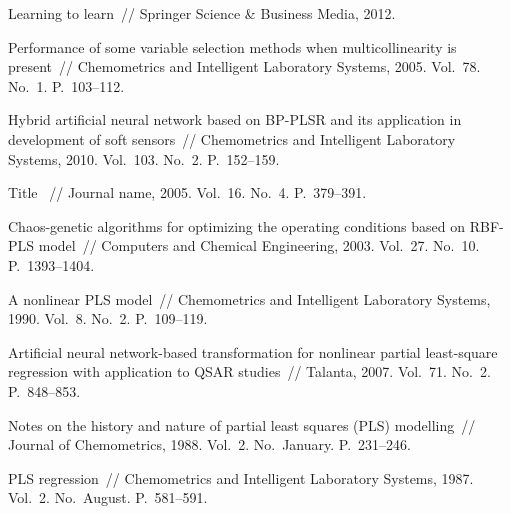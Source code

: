 \documentclass[12pt,twoside]{article}
\begin{document}

\begin{thebibliography}{10}
\def\selectlanguageifdefined#1{
\expandafter\ifx\csname date#1\endcsname\relax
\else\selectlanguage{#1}\fi}

{Learning to learn}~//
Springer Science \& Business Media, 2012.

{Performance of some variable selection methods when multicollinearity is present}~//
Chemometrics and Intelligent Laboratory Systems, 2005.
Vol.~78.
No.~1.
P.~103--112.

{Hybrid artificial neural network based on BP-PLSR and its application in development of soft sensors}~//
Chemometrics and Intelligent Laboratory Systems, 2010.
Vol.~103.
No.~2.
P.~152--159.

{Title }~//
Journal name, 2005.
Vol.~16.
No.~4.
P.~379--391.

{Chaos-genetic algorithms for optimizing the operating conditions based on RBF-PLS model}~//
Computers and Chemical Engineering, 2003.
Vol.~27.
No.~10.
P.~1393--1404.

{A nonlinear PLS model}~//
Chemometrics and Intelligent Laboratory Systems, 1990.
Vol.~8.
No.~2.
P.~109--119.

{Artificial neural network-based transformation for nonlinear partial least-square regression with application to QSAR studies}~//
Talanta, 2007.
Vol.~71.
No.~2.
P.~848--853.


{Notes on the history and nature of partial least squares (PLS) modelling}~//
Journal of Chemometrics, 1988.
Vol.~2.
No.~January.
P.~231--246.


{PLS regression}~//
Chemometrics and Intelligent Laboratory Systems, 1987.
Vol.~2.
No.~August.
P.~581--591.



\end{thebibliography}
\end{document}
